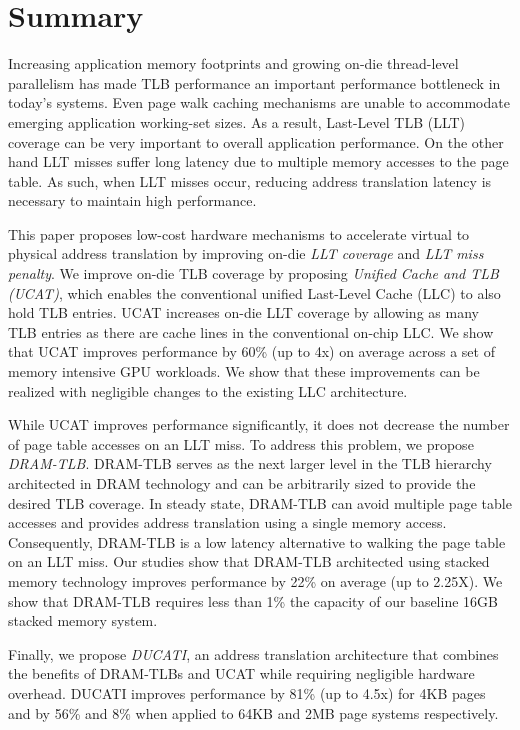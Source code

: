 \section{Summary}

\noindent Increasing application memory footprints and growing on-die
thread-level parallelism has made TLB performance an important
performance bottleneck in today's systems. Even page walk caching
mechanisms are unable to accommodate emerging application working-set
sizes. As a result, Last-Level TLB (LLT) coverage can be very
important to overall application performance. On the other hand LLT
misses suffer long latency due to multiple memory accesses to the page
table. As such, when LLT misses occur, reducing address translation
latency is necessary to maintain high performance.

This paper proposes low-cost hardware mechanisms to accelerate virtual
to physical address translation by improving on-die {\em LLT coverage}
and {\em LLT miss penalty}. We improve on-die TLB coverage by
proposing {\em Unified Cache and TLB (UCAT)}, which enables the
conventional unified Last-Level Cache (LLC) to also hold TLB entries.
UCAT increases on-die LLT coverage by allowing as many TLB entries as
there are cache lines in the conventional on-chip LLC. We show that
UCAT improves performance by 60\% (up to 4x) on average across a set
of memory intensive GPU workloads. We show that these improvements can
be realized with negligible changes to the existing LLC architecture.


While UCAT improves performance significantly, it does not decrease
the number of page table accesses on an LLT miss. To address this
problem, we propose {\em DRAM-TLB}. DRAM-TLB serves as the next larger
level in the TLB hierarchy architected in DRAM technology and can be
arbitrarily sized to provide the desired TLB coverage. In steady
state, DRAM-TLB can avoid multiple page table accesses and provides
address translation using a single memory access. Consequently,
DRAM-TLB is a low latency alternative to walking the page table on an
LLT miss. Our studies show that DRAM-TLB architected using stacked
memory technology improves performance by 22\% on average (up to
2.25X). We show that DRAM-TLB requires less than 1\% the capacity of
our baseline 16GB stacked memory system.

Finally, we propose {\em DUCATI}, an address translation architecture
that combines the benefits of DRAM-TLBs and UCAT while requiring
negligible hardware overhead. DUCATI improves performance by 81\% (up
to 4.5x) for 4KB pages and by 56\% and 8\% when applied to 64KB and
2MB page systems respectively.

% 
